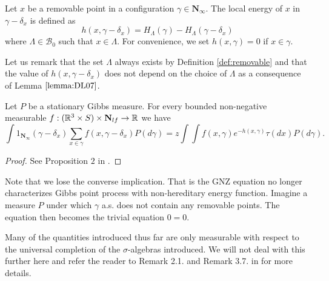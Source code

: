 \begin{definition}\label{def:localenergy}
	Let $x$ be a removable point in a configuration $\gamma\in \mathbf N_\infty$. The local energy of $x$ in $\gamma - \delta_x$ is defined as
	$$h(x,\gamma - \delta_x) = H_\Lambda (\gamma) - H_\Lambda(\gamma - \delta_x)$$
	where $\Lambda \in \mathcal B_0$ such that $x \in \Lambda$. For convenience, we set $h(x,\gamma)=0$ if $x \in \gamma$. 
\end{definition}
Let us remark that the set $\Lambda$ always exists by Definition \ref{def:removable} and that the value of $h(x,\gamma-\delta_x)$ does not depend on the choice of $\Lambda$ as a consequence of Lemma $\ref{lemma:DL07}$.


\begin{proposition}
	Let $P$ be a stationary Gibbs measure. For every bounded non-negative measurable $f:({\mathbb R^3}\times S) \times \mathbf N_{lf}\to\mathbb R$ we have
	$$\int 1_{\mathbf N_\infty}(\gamma-\delta_x) \sum_{x \in \gamma} f(x,\gamma -\delta_x) P(d\gamma) = z \int \int f(x,\gamma)e^{-h(x,\gamma)} \tau(dx) P(d\gamma).$$
\end{proposition}
\begin{proof}
	See Proposition $2$ in \cite{DereudreLavancier2009}.
\end{proof}

Note that we lose the converse implication. That is the GNZ equation no longer characterizes Gibbs point process with non-hereditary energy function. Imagine a measure $P$ under which $\gamma$ a.s. does not contain any removable points. The equation then becomes the trivial equation $0=0$.



\begin{remark}[Measurability] Many of the quantities introduced thus far are only measurable with respect to the universal completion of the $\sigma$-algebras introduced. We will not deal with this further here and  refer the reader to Remark 2.1. and Remark 3.7. in \cite{DDG12} for more details. 
\end{remark}

